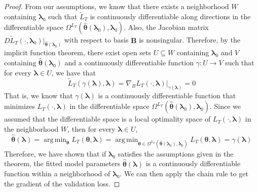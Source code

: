 \documentclass[10pt,letterpaper]{article}
\DeclareMathOperator*{\argmin}{arg\,min}
\begin{document}
\begin{proof}
From our assumptions, we know that there exists a neighborhood $W$ containing $\boldsymbol \lambda_0$ such that $\tilde L_T$ is continuously differentiable along directions in the differentiable space $\Omega^{L_T}(\hat {\boldsymbol \theta}(\boldsymbol \lambda_0), \boldsymbol \lambda_0)$. Also, the Jacobian matrix $D \tilde L_T(\cdot, \boldsymbol \lambda_0)|_{\hat {\boldsymbol \theta}(\boldsymbol \lambda_0)}$ with respect to basis $\boldsymbol B$ is nonsingular. Therefore, by the implicit function theorem, there exist open sets $U \subseteq W$ containing $\boldsymbol \lambda_0$ and $V$ containing $\hat {\boldsymbol \theta}(\boldsymbol \lambda_0)$ and a continuously differentiable function $\gamma: U \rightarrow V$ such that for every $\boldsymbol \lambda \in U$, we have that 
\begin{equation}
\tilde L_T(\gamma(\boldsymbol \lambda), \boldsymbol \lambda) = \nabla_{B} L_T(\cdot, \boldsymbol \lambda)|_{\gamma(\boldsymbol \lambda)} = 0
\end{equation}
That is, we know that $\gamma(\boldsymbol \lambda)$ is a continuously differentiable function that minimizes $L_T(\cdot, \boldsymbol \lambda)$ in the differentiable space  $\Omega^{L_T}(\hat {\boldsymbol \theta}(\boldsymbol \lambda_0), \boldsymbol \lambda_0)$.
Since we assumed that the differentiable space is a local optimality space of $L_T(\cdot, \boldsymbol \lambda)$ in the neighborhood $W$, then for every $\boldsymbol \lambda \in U$, 
\begin{equation}
\hat {\boldsymbol \theta}(\boldsymbol \lambda) =
\argmin_{\boldsymbol \theta} L_T(\boldsymbol \theta, \boldsymbol \lambda) =
\argmin_{\boldsymbol \theta \in \Omega^{L_T}(\hat {\boldsymbol \theta}(\boldsymbol \lambda_0), \boldsymbol \lambda_0)} L_T(\boldsymbol \theta, \boldsymbol \lambda) =
\gamma(\boldsymbol \lambda)
\end{equation}
Therefore, we have shown that if $\boldsymbol \lambda_0$ satisfies the assumptions given in the theorem, the fitted model parameters $\hat {\boldsymbol \theta}(\boldsymbol \lambda)$ is a continuously differentiable function within a neighborhood of $\boldsymbol \lambda_0$. We can then apply the chain rule to get the gradient of the validation loss.
\end{proof}
\end{document}
